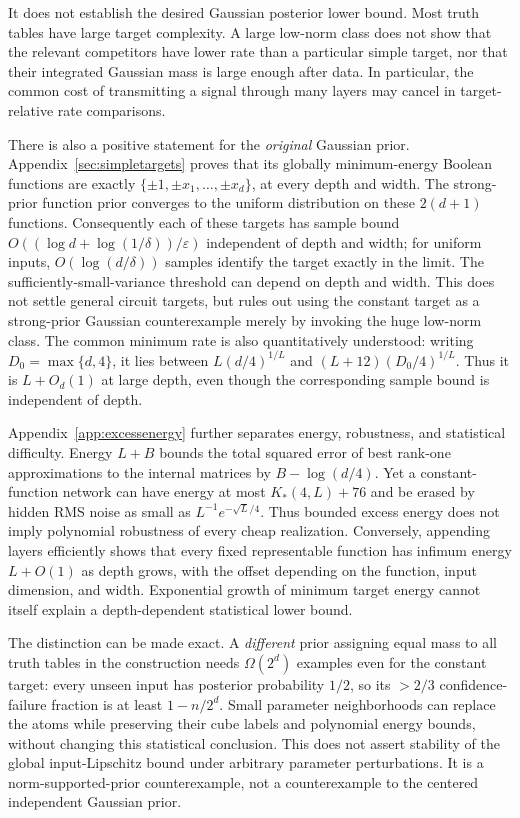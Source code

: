 \documentclass[11pt]{article}
\begin{document}
It does not establish the desired Gaussian posterior lower bound. Most
truth tables have large target complexity. A large low-norm class does not
show that the relevant competitors have lower rate than a particular simple
target, nor that their integrated Gaussian mass is large enough after data.
In particular, the common cost of transmitting a signal through many layers
may cancel in target-relative rate comparisons.

There is also a positive statement for the \emph{original} Gaussian prior.
Appendix~\ref{sec:simpletargets} proves that its globally minimum-energy
Boolean functions are exactly $\{\pm1,\pm x_1,\ldots,\pm x_d\}$, at every
depth and width. The strong-prior function prior converges to the uniform
distribution on these $2(d+1)$ functions. Consequently each of these targets
has sample bound $O((\log d+\log(1/\delta))/\varepsilon)$ independent of
depth and width; for uniform inputs, $O(\log(d/\delta))$ samples identify
the target exactly in the limit. The sufficiently-small-variance threshold
can depend on depth and width. This does not settle general circuit targets,
but rules out using the constant target as a strong-prior Gaussian
counterexample merely by invoking the huge low-norm class.
The common minimum rate is also quantitatively understood: writing
$D_0=\max\{d,4\}$, it lies between $L(d/4)^{1/L}$ and
$(L+12)(D_0/4)^{1/L}$. Thus it is $L+O_d(1)$ at large depth, even though
the corresponding sample bound is independent of depth.

Appendix~\ref{app:excessenergy} further separates energy, robustness, and
statistical difficulty. Energy $L+B$ bounds the total squared error of best
rank-one approximations to the internal matrices by $B-\log(d/4)$.
Yet a constant-function network can have energy at most $K_*(4,L)+76$
and be erased by hidden RMS noise as small as $L^{-1}e^{-\sqrt L/4}$.
Thus bounded excess energy does not imply polynomial robustness of every
cheap realization. Conversely, appending layers efficiently shows that
every fixed representable function has infimum energy $L+O(1)$ as depth
grows, with the offset depending on the function, input dimension, and width.
Exponential growth of minimum target energy cannot itself explain a
depth-dependent statistical lower bound.

The distinction can be made exact. A \emph{different} prior assigning equal
mass to all truth tables in the construction needs $\Omega(2^d)$ examples
even for the constant target: every unseen input has posterior probability
$1/2$, so its $>2/3$ confidence-failure fraction is at least $1-n/2^d$.
Small parameter neighborhoods can replace the atoms while preserving their
cube labels and polynomial energy bounds, without changing this statistical
conclusion. This does not assert stability of the global input-Lipschitz
bound under arbitrary parameter perturbations. It is a norm-supported-prior
counterexample, not a counterexample
to the centered independent Gaussian prior.
\end{document}
